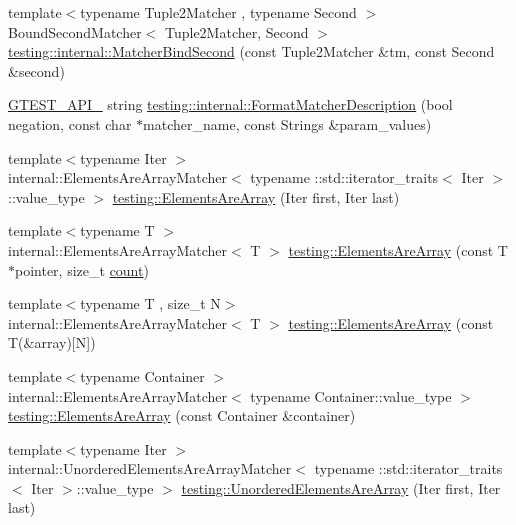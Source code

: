 \begin{DoxyCompactItemize}
{\footnotesize template$<$typename Tuple2\+Matcher , typename Second $>$ }\\Bound\+Second\+Matcher$<$ Tuple2\+Matcher, Second $>$ \hyperlink{namespacetesting_1_1internal_a31eb77a2bb0ca713d6ef07d8a3b9af9e}{testing\+::internal\+::\+Matcher\+Bind\+Second} (const Tuple2\+Matcher \&tm, const Second \&second)
\item 
\hyperlink{gtest-port_8h_aa73be6f0ba4a7456180a94904ce17790}{G\+T\+E\+S\+T\+\_\+\+A\+P\+I\+\_\+} string \hyperlink{namespacetesting_1_1internal_a593b52fcbb46a765a31850661b1960f4}{testing\+::internal\+::\+Format\+Matcher\+Description} (bool negation, const char $\ast$matcher\+\_\+name, const Strings \&param\+\_\+values)
\item 
{\footnotesize template$<$typename Iter $>$ }\\internal\+::\+Elements\+Are\+Array\+Matcher$<$ typename \+::std\+::iterator\+\_\+traits$<$ Iter $>$\+::value\+\_\+type $>$ \hyperlink{namespacetesting_ae2eee06e7ddbf5f5372fd24372e9703f}{testing\+::\+Elements\+Are\+Array} (Iter first, Iter last)
\item 
{\footnotesize template$<$typename T $>$ }\\internal\+::\+Elements\+Are\+Array\+Matcher$<$ T $>$ \hyperlink{namespacetesting_abf5c2219b4e6a7542368b5f68eadd007}{testing\+::\+Elements\+Are\+Array} (const T $\ast$pointer, size\+\_\+t \hyperlink{gmock__stress__test_8cc_afd9db40e3361ae09188795e8cbe19752}{count})
\item 
{\footnotesize template$<$typename T , size\+\_\+t N$>$ }\\internal\+::\+Elements\+Are\+Array\+Matcher$<$ T $>$ \hyperlink{namespacetesting_ac5895c9867d6b976351446a043dcdd66}{testing\+::\+Elements\+Are\+Array} (const T(\&array)\mbox{[}N\mbox{]})
\item 
{\footnotesize template$<$typename Container $>$ }\\internal\+::\+Elements\+Are\+Array\+Matcher$<$ typename Container\+::value\+\_\+type $>$ \hyperlink{namespacetesting_ad257747adbe056feaa92f449063d681f}{testing\+::\+Elements\+Are\+Array} (const Container \&container)
\item 
{\footnotesize template$<$typename Iter $>$ }\\internal\+::\+Unordered\+Elements\+Are\+Array\+Matcher$<$ typename \+::std\+::iterator\+\_\+traits$<$ Iter $>$\+::value\+\_\+type $>$ \hyperlink{namespacetesting_ab4896081406209171a1596b7028e1cf7}{testing\+::\+Unordered\+Elements\+Are\+Array} (Iter first, Iter last)
\item 

\end{DoxyCompactItemize}
